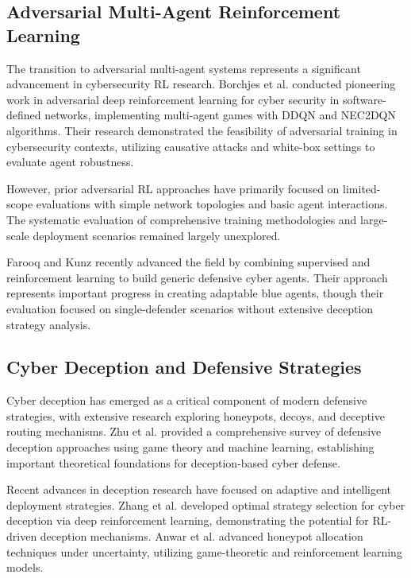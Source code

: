 \documentclass[12pt,twoside]{article}
\begin{document}
\subsection{Adversarial Multi-Agent Reinforcement Learning}

The transition to adversarial multi-agent systems represents a significant advancement in cybersecurity RL research. Borchjes et al. \cite{borchjes2023adversarial} conducted pioneering work in adversarial deep reinforcement learning for cyber security in software-defined networks, implementing multi-agent games with DDQN and NEC2DQN algorithms. Their research demonstrated the feasibility of adversarial training in cybersecurity contexts, utilizing causative attacks and white-box settings to evaluate agent robustness.

However, prior adversarial RL approaches have primarily focused on limited-scope evaluations with simple network topologies and basic agent interactions. The systematic evaluation of comprehensive training methodologies and large-scale deployment scenarios remained largely unexplored.

Farooq and Kunz \cite{farooq2025combining} recently advanced the field by combining supervised and reinforcement learning to build generic defensive cyber agents. Their approach represents important progress in creating adaptable blue agents, though their evaluation focused on single-defender scenarios without extensive deception strategy analysis.

\subsection{Cyber Deception and Defensive Strategies}

Cyber deception has emerged as a critical component of modern defensive strategies, with extensive research exploring honeypots, decoys, and deceptive routing mechanisms. Zhu et al. \cite{zhu2021survey} provided a comprehensive survey of defensive deception approaches using game theory and machine learning, establishing important theoretical foundations for deception-based cyber defense.

Recent advances in deception research have focused on adaptive and intelligent deployment strategies. Zhang et al. \cite{zhang2022optimal} developed optimal strategy selection for cyber deception via deep reinforcement learning, demonstrating the potential for RL-driven deception mechanisms. Anwar et al. \cite{anwar2022honeypot} advanced honeypot allocation techniques under uncertainty, utilizing game-theoretic and reinforcement learning models.
\end{document}
